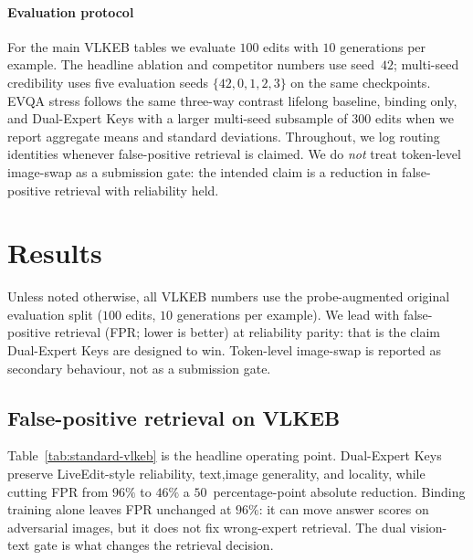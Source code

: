 \documentclass[letterpaper]{article} %
\begin{document}
\paragraph{Evaluation protocol}
For the main VLKEB tables we evaluate $100$ edits with $10$ generations per example.
The headline ablation and competitor numbers use seed~$42$; multi-seed credibility uses five evaluation seeds $\{42,0,1,2,3\}$ on the same checkpoints.
EVQA stress follows the same three-way contrast lifelong baseline, binding only, and Dual-Expert Keys with a larger multi-seed subsample of $300$ edits when we report aggregate means and standard deviations.
Throughout, we log routing identities whenever false-positive retrieval is claimed.
We do \emph{not} treat token-level image-swap as a submission gate: the intended claim is a reduction in false-positive retrieval with reliability held.


\section{Results}
\label{sec:results}



Unless noted otherwise, all VLKEB numbers use the probe-augmented original evaluation split ($100$ edits, $10$ generations per example).
We lead with false-positive retrieval (FPR; lower is better) at reliability parity: that is the claim Dual-Expert Keys are designed to win.
Token-level image-swap is reported as secondary behaviour, not as a submission gate.

\subsection{False-positive retrieval on VLKEB}
Table~\ref{tab:standard-vlkeb} is the headline operating point.
Dual-Expert Keys preserve LiveEdit-style reliability, text,image generality, and locality, while cutting FPR from $96\%$ to $46\%$ a $50$~percentage-point absolute reduction.
Binding training alone leaves FPR unchanged at $96\%$: it can move answer scores on adversarial images, but it does not fix wrong-expert retrieval.
The dual vision-text gate is what changes the retrieval decision.
\end{document}
